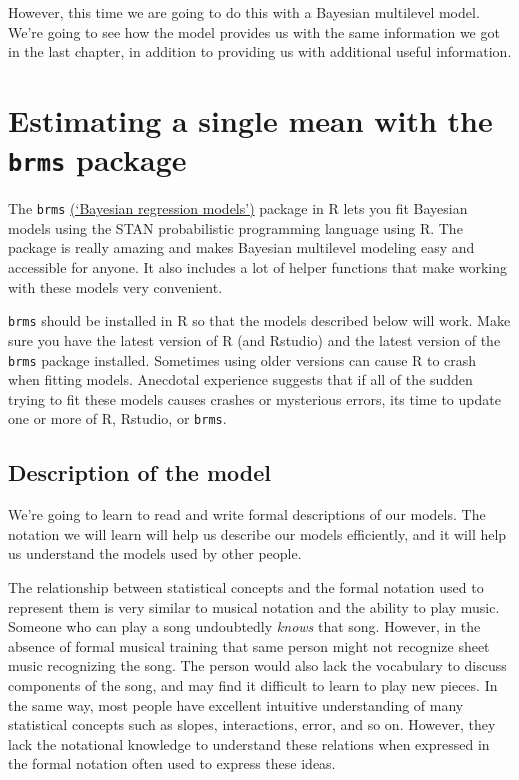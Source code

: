 \documentclass[
]{book}
\begin{document}
However, this time we are going to do this with a Bayesian multilevel model. We're going to see how the model provides us with the same information we got in the last chapter, in addition to providing us with additional useful information.

\hypertarget{estimating-a-single-mean-with-the-brms-package}{%
\section{\texorpdfstring{Estimating a single mean with the \texttt{brms} package}{Estimating a single mean with the brms package}}\label{estimating-a-single-mean-with-the-brms-package}}

The \texttt{brms} \href{https://github.com/paul-buerkner/brms}{(`Bayesian regression models')} package in R lets you fit Bayesian models using the STAN probabilistic programming language using R. The package is really amazing and makes Bayesian multilevel modeling easy and accessible for anyone. It also includes a lot of helper functions that make working with these models very convenient.

\texttt{brms} should be installed in R so that the models described below will work. Make sure you have the latest version of R (and Rstudio) and the latest version of the \texttt{brms} package installed. Sometimes using older versions can cause R to crash when fitting models. Anecdotal experience suggests that if all of the sudden trying to fit these models causes crashes or mysterious errors, its time to update one or more of R, Rstudio, or \texttt{brms}.

\hypertarget{description-of-the-model}{%
\subsection{Description of the model}\label{description-of-the-model}}

We're going to learn to read and write formal descriptions of our models. The notation we will learn will help us describe our models efficiently, and it will help us understand the models used by other people.

The relationship between statistical concepts and the formal notation used to represent them is very similar to musical notation and the ability to play music. Someone who can play a song undoubtedly \emph{knows} that song. However, in the absence of formal musical training that same person might not recognize sheet music recognizing the song. The person would also lack the vocabulary to discuss components of the song, and may find it difficult to learn to play new pieces. In the same way, most people have excellent intuitive understanding of many statistical concepts such as slopes, interactions, error, and so on. However, they lack the notational knowledge to understand these relations when expressed in the formal notation often used to express these ideas.
\end{document}
